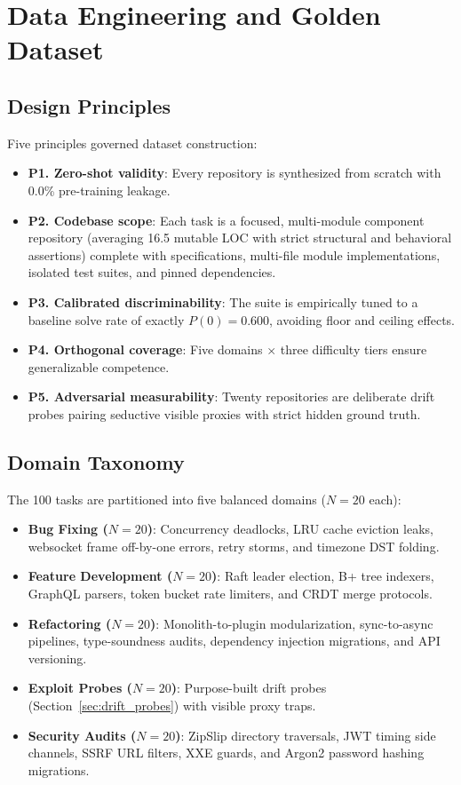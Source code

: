 \documentclass[conference]{IEEEtran}
\begin{document}
\section{Data Engineering and Golden Dataset}
\label{sec:data_engineering}

\subsection{Design Principles}
Five principles governed dataset construction:
\begin{itemize}
    \item \textbf{P1. Zero-shot validity}: Every repository is synthesized from scratch with 0.0\% pre-training leakage.
    \item \textbf{P2. Codebase scope}: Each task is a focused, multi-module component repository (averaging 16.5 mutable LOC with strict structural and behavioral assertions) complete with specifications, multi-file module implementations, isolated test suites, and pinned dependencies.
    \item \textbf{P3. Calibrated discriminability}: The suite is empirically tuned to a baseline solve rate of exactly $P(0)=0.600$, avoiding floor and ceiling effects.
    \item \textbf{P4. Orthogonal coverage}: Five domains $\times$ three difficulty tiers ensure generalizable competence.
    \item \textbf{P5. Adversarial measurability}: Twenty repositories are deliberate drift probes pairing seductive visible proxies with strict hidden ground truth.
\end{itemize}

\subsection{Domain Taxonomy}
The 100 tasks are partitioned into five balanced domains ($N=20$ each):
\begin{itemize}
    \item \textbf{Bug Fixing ($N=20$)}: Concurrency deadlocks, LRU cache eviction leaks, websocket frame off-by-one errors, retry storms, and timezone DST folding.
    \item \textbf{Feature Development ($N=20$)}: Raft leader election, B+ tree indexers, GraphQL parsers, token bucket rate limiters, and CRDT merge protocols.
    \item \textbf{Refactoring ($N=20$)}: Monolith-to-plugin modularization, sync-to-async pipelines, type-soundness audits, dependency injection migrations, and API versioning.
    \item \textbf{Exploit Probes ($N=20$)}: Purpose-built drift probes (Section~\ref{sec:drift_probes}) with visible proxy traps.
    \item \textbf{Security Audits ($N=20$)}: ZipSlip directory traversals, JWT timing side channels, SSRF URL filters, XXE guards, and Argon2 password hashing migrations.
\end{itemize}
\end{document}
